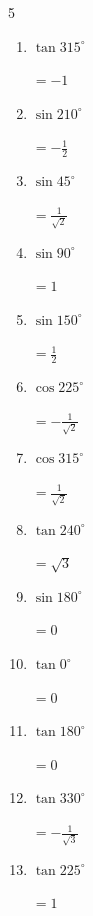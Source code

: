 \begin{multicols}{5}
\begin{enumerate}
        $\displaystyle =-\frac{\sqrt{3}}{2}$

  \item $\displaystyle \tan{315^\circ}$

        $\displaystyle =-1$

  \item $\displaystyle \sin{210^\circ}$

        $\displaystyle =-\frac{1}{2}$

  \item $\displaystyle \sin{45^\circ}$

        $\displaystyle =\frac{1}{\sqrt{2}}$

  \item $\displaystyle \sin{90^\circ}$

        $\displaystyle =1$

  \item $\displaystyle \sin{150^\circ}$

        $\displaystyle =\frac{1}{2}$

  \item $\displaystyle \cos{225^\circ}$

        $\displaystyle =-\frac{1}{\sqrt{2}}$

  \item $\displaystyle \cos{315^\circ}$

        $\displaystyle =\frac{1}{\sqrt{2}}$

  \item $\displaystyle \tan{240^\circ}$

        $\displaystyle =\sqrt{3}$

  \item $\displaystyle \sin{180^\circ}$

        $\displaystyle =0$

  \item $\displaystyle \tan{0^\circ}$

        $\displaystyle =0$

  \item $\displaystyle \tan{180^\circ}$

        $\displaystyle =0$

  \item $\displaystyle \tan{330^\circ}$

        $\displaystyle =-\frac{1}{\sqrt{3}}$

  \item $\displaystyle \tan{225^\circ}$

        $\displaystyle =1$


\end{enumerate}
\end{multicols}
